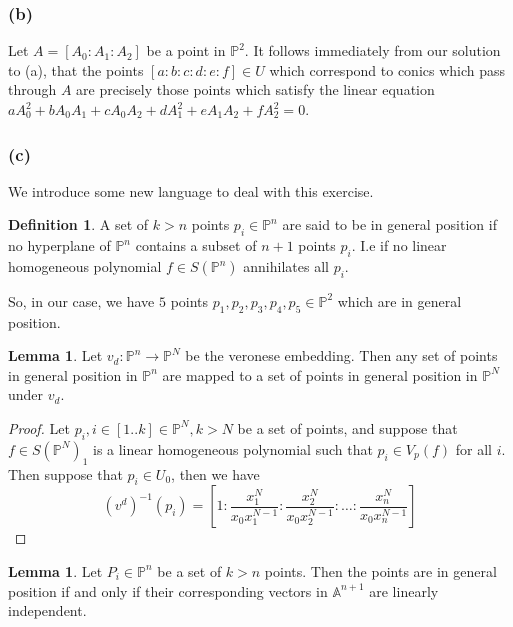 \documentclass{article}
\theoremstyle{definition}
\newtheorem{definition}[theorem]{Definition}
\newtheorem{lemma}[theorem]{Lemma}
\renewcommand{\P}{\mathbb{P}}
\newcommand{\A}{\mathbb{A}}
\renewcommand{\AA}[1]{\A^{#1}}
\newcommand{\PP}[1]{\P^{#1}}
\begin{document}
\subsubsection*{(b)}

Let $A=[A_0:A_1:A_2]$ be a point in $\PP{2}$. It follows immediately from our
solution to (a), that the points $[a:b:c:d:e:f] \in U$ which correspond to
conics which pass through $A$ are precisely those points which satisfy the
linear equation $aA_0^{2} + bA_0A_1 + cA_0A_2 + dA_1^{2} + eA_1A_2 + fA_2^{2} =
0$. \\

\subsubsection*{(c)}

We introduce some new language to deal with this exercise. 

\begin{definition}
	A set of $k > n$ points $p_i \in \PP{n}$ are said to be in general position
	if no hyperplane of $\PP{n}$ contains a subset of $n + 1$ points $p_i$. I.e
	if no linear homogeneous polynomial $f \in S(\PP{n})$ annihilates all
	$p_i$.
\end{definition}

So, in our case, we have $5$ points $p_1,p_2,p_3,p_4,p_5 \in \PP{2}$
which are in general position. 

\begin{lemma}
	Let	$v_d : \PP{n} \to \PP{N}$ be the veronese embedding. Then any set of
	points in general position in $\PP{n}$ are mapped to a set of points in
	general position in $\PP{N}$ under $v_d$.
\end{lemma}
\begin{proof}
	Let $p_i, i \in [1..k] \in \PP{N}, k > N$ be a set of points, and suppose
	that $f \in S(\PP{N})_1$ is a linear homogeneous polynomial such that $p_i
	\in V_p(f)$ for all $i$. Then suppose that $p_i \in U_0$, then we have 
	\[
		(v^{d})^{-1}(p_i) 
		= 
		\left[
			1 : 
			\frac{x_1^{N}}{x_0 x_1^{N-1}} : 
			\frac{x_2^{N}}{x_0 x_2^{N-1}} :
			\ldots :
			\frac{x_n^{N}}{x_0 x_n^{N-1}}
		\right]
	\]
\end{proof}



\begin{lemma}
	Let $P_i \in \PP{n}$ be a set of $k > n$ points. Then
	the points are in general position if and only if their 
	corresponding vectors in $\AA{n + 1}$ are linearly independent.
\end{lemma}
\end{document}
